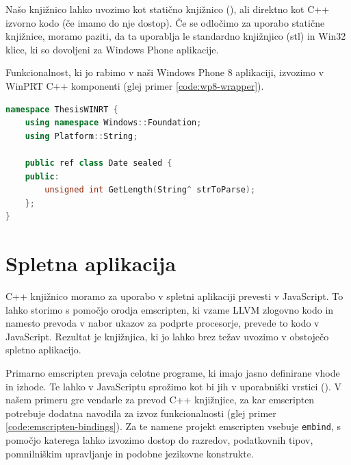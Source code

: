 Našo knjižnico lahko uvozimo kot statično knjižnico (), ali direktno kot C++ izvorno kodo (če imamo do nje dostop). Če se odločimo za uporabo statične knjižnice, moramo paziti, da ta uporablja le standardno knjižnjico (\gls{stl}) in Win32 klice, ki so dovoljeni za Windows Phone aplikacije\cite{windows-static}.

Funkcionalnost, ki jo rabimo v naši Windows Phone 8 aplikaciji, izvozimo v WinPRT C++ komponenti (glej primer \ref{code:wp8-wrapper}).

\lstset{language=[Sharp]C, breaklines}
\begin{lstlisting}[caption={C++ koda za izvoz funckionalnosti knjižnice v JavaScript razreda \texttt{Date}.}, label=code:wp8-wrapper, language=c++]
namespace ThesisWINRT {
    using namespace Windows::Foundation;
    using Platform::String;

    public ref class Date sealed {
    public:
        unsigned int GetLength(String^ strToParse);
    };
}
\end{lstlisting}

\section{Spletna aplikacija}

C++ knjižnico moramo za uporabo v spletni aplikaciji prevesti v JavaScript. To lahko storimo s pomočjo orodja emscripten, ki vzame LLVM zlogovno kodo in namesto prevoda v nabor ukazov za podprte procesorje, prevede to kodo v JavaScript. Rezultat je knjižnjica, ki jo lahko brez težav uvozimo v obstoječo spletno aplikacijo.

Primarno emscripten prevaja celotne programe, ki imajo jasno definirane vhode in izhode. Te lahko v JavaScriptu sprožimo kot bi jih v uporabniški vrstici (). V našem primeru gre vendarle za prevod C++ knjižnjice, za kar emscripten potrebuje dodatna navodila za izvoz funkcionalnosti (glej primer \ref{code:emscripten-bindings}). Za te namene projekt emscripten vsebuje \texttt{embind}\cite{emscripten-embind}, s pomočjo katerega lahko izvozimo dostop do razredov, podatkovnih tipov, pomnilniškim upravljanje in podobne jezikovne konstrukte.

